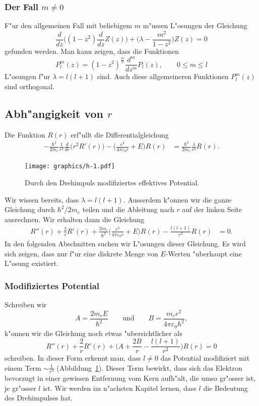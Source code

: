 \subsubsection{Der Fall $m\ne 0$}
F"ur den allgemeinen Fall mit beliebigem $m$ m"ussen L"osungen der
Gleichung
\begin{equation}
\frac{d}{dz}\biggl((1-z^2)\frac{d}{dz}Z(z)\biggr)
+\biggl(\lambda -\frac{m^2}{1-z^2}\biggr)Z(z)=0
\end{equation}
gefunden werden. Man kann zeigen, dass die Funktionen
\[
P_l^m(z)=
(1-z^2)^{\frac{m}2}\frac{d^m}{dz^m}P_l(z),
\qquad
0\le m\le l
\]
L"osungen f"ur $\lambda=l(l+1)$ sind.
Auch diese allgemeineren Funktionen $P_l^m(z)$ sind orthogonal.

\subsection{Abh"angigkeit von $r$}
Die Funktion $R(r)$ erf"ullt die Differentialgleichung
\begin{align}
-\frac{\hbar^2}{2m_e} \frac{1}{r^2}\frac{d}{dr}\bigl(r^2R'(r)\bigr)
-
\biggl(\frac{e^2}{4\pi\varepsilon_0r} + E \biggr) R(r)
&=
\frac{\hbar^2}{2m_e}\frac{\lambda}{r^2}
R(r).
\label{skript:radialgleichung}
\end{align}
\begin{figure}
\centering
\texttt{[image: graphics/h-1.pdf]}
\caption{Durch den Drehimpuls modifiziertes effektives Potential.
\label{skript:modifiziertes-potential}}
\end{figure}%
%
Wir wissen bereits, dass $\lambda=l(l+1)$.
Ausserdem k"onnen wir die ganze Gleichung durch $\hbar^2/2m_e$ teilen
und die Ableitung nach $r$ auf der linken Seite ausrechnen. 
Wir erhalten dann die Gleichung
\begin{align*}
R''(r)+\frac{2}{r}R'(r)
+\frac{2m_e}{\hbar^2}
\biggl(\frac{e^2}{4\pi\varepsilon_0r} + E \biggr) R(r)
-\frac{l(l+1)}{r^2}
R(r)
&=0.
\end{align*}
In den folgenden Abschnitten suchen wir L"osungen dieser Gleichung.
Es wird sich zeigen, dass nur f"ur eine diskrete Menge von $E$-Werten
"uberhaupt eine L"osung existiert.
\subsubsection{Modifiziertes Potential}
Schreiben wir
\begin{equation}
A=\frac{2m_eE}{\hbar^2}
\qquad\text{und}\qquad
B=\frac{m_ee^2}{4\pi\varepsilon_0\hbar^2},
\label{skript:AundB}
\end{equation}
k"onnen wir die Gleichung noch etwas "ubersichtlicher als
\begin{equation}
R''(r)+\frac2{r}R'(r)+\biggl(A+\frac{2B}r-\frac{l(l+1)}{r^2}\biggr)R(r)=0
\label{skript:hreduziert}
\end{equation}
schreiben.
In dieser Form erkennt man, dass $l\ne 0$
das Potential modifiziert mit einem Term
$\sim\frac1{r^2}$ (Abbildung~\ref{skript:modifiziertes-potential}).
Dieser Term bewirkt, dass sich das Elektron bevorzugt in einer
gewissen Entfernung vom Kern aufh"alt, die umso gr"osser ist, je
gr"osser $l$ ist.
Wir werden im n"achsten Kapitel lernen, dass $l$ die Bedeutung des
Drehimpulses hat.

